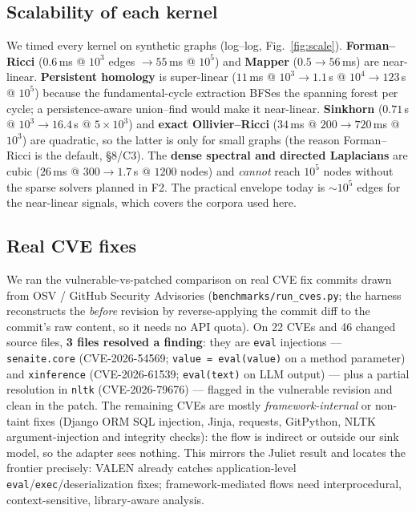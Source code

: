 \documentclass[11pt]{article}
\begin{document}
\subsection{Scalability of each kernel}
We timed every kernel on synthetic graphs (log--log, Fig.~\ref{fig:scale}).
\textbf{Forman--Ricci} ($0.6$\,ms @ $10^3$ edges $\to 55$\,ms @ $10^5$) and
\textbf{Mapper} ($0.5\to56$\,ms) are near-linear. \textbf{Persistent homology} is
super-linear ($11$\,ms @ $10^3 \to 1.1$\,s @ $10^4 \to 123$\,s @ $10^5$) because
the fundamental-cycle extraction BFSes the spanning forest per cycle; a
persistence-aware union--find would make it near-linear. \textbf{Sinkhorn}
($0.71$\,s @ $10^3 \to 16.4$\,s @ $5\times10^3$) and \textbf{exact
Ollivier--Ricci} ($34$\,ms @ $200 \to 720$\,ms @ $10^3$) are quadratic, so the
latter is only for small graphs (the reason Forman--Ricci is the default,
\S8/C3). The \textbf{dense spectral and directed Laplacians} are cubic
($26$\,ms @ $300 \to 1.7$\,s @ $1200$ nodes) and \emph{cannot} reach $10^5$
nodes without the sparse solvers planned in F2. The practical envelope today is
$\sim10^5$ edges for the near-linear signals, which covers the corpora used here.



\subsection{Real CVE fixes}
We ran the vulnerable-vs-patched comparison on real CVE fix commits drawn from
OSV / GitHub Security Advisories (\texttt{benchmarks/run\_cves.py}; the harness
reconstructs the \emph{before} revision by reverse-applying the commit diff to
the commit's raw content, so it needs no API quota). On 22 CVEs and 46 changed
source files, \textbf{3 files resolved a finding}: they are \texttt{eval}
injections --- \texttt{senaite.core} (CVE-2026-54569; \texttt{value = eval(value)}
on a method parameter) and \texttt{xinference} (CVE-2026-61539;
\texttt{eval(text)} on LLM output) --- plus a partial resolution in
\texttt{nltk} (CVE-2026-79676) --- flagged in the vulnerable revision and
clean in the patch. The remaining CVEs are mostly \emph{framework-internal} or
non-taint fixes (Django ORM SQL injection, Jinja, requests, GitPython, NLTK
argument-injection and integrity checks): the flow is indirect or outside our
sink model, so the adapter sees nothing. This mirrors the Juliet result and
locates the frontier precisely: VALEN already catches application-level
\texttt{eval}/\texttt{exec}/deserialization fixes; framework-mediated flows need
interprocedural, context-sensitive, library-aware analysis.
\end{document}
